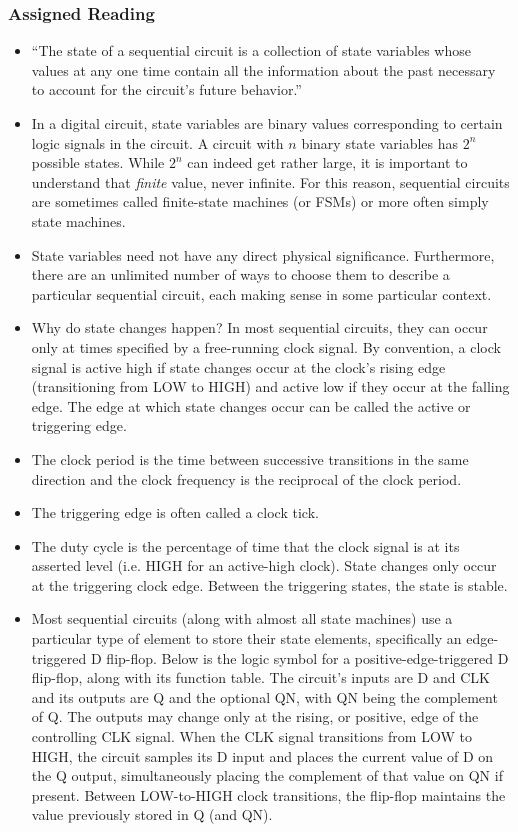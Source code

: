 \documentclass[10pt,a4paper]{article}
\begin{document}
\subsubsection{Assigned Reading}
\begin{itemize}
\item ``The state of a sequential circuit is a collection of state variables whose values at any one time contain all the information about the past necessary to account for the circuit's future behavior.''
\item In a digital circuit, state variables are binary values corresponding to certain logic signals in the circuit. A circuit with $n$ binary state variables has $2^n$ possible states. While $2^n$ can indeed get rather large, it is important to understand that \textit{finite} value, never infinite. For this reason, sequential circuits are sometimes called finite-state machines (or FSMs) or more often simply state machines.
\item State variables need not have any direct physical significance. Furthermore, there are an unlimited number of ways to choose them to describe a particular sequential circuit, each making sense in some particular context. 
\item Why do state changes happen? In most sequential circuits, they can occur only at times specified by a free-running clock signal. By convention, a clock signal is active high if state changes occur at the clock's rising edge (transitioning from LOW to HIGH) and active low if they occur at the falling edge. The edge at which state changes occur can be called the active or triggering edge. 
\item The clock period is the time between successive transitions in the same direction and the clock frequency is the reciprocal of the clock period. 
\item The triggering edge is often called a clock tick.
\item The duty cycle is the percentage of time that the clock signal is at its asserted level (i.e. HIGH for an active-high clock). State changes only occur at the triggering clock edge. Between the triggering states, the state is stable.
\item Most sequential circuits (along with almost all state machines) use a particular type of element to store their state elements, specifically an edge-triggered D flip-flop. Below is the logic symbol for a positive-edge-triggered D flip-flop, along with its function table. The circuit's inputs are D and CLK and its outputs are Q and the optional QN, with QN being the complement of Q. The outputs may change only at the rising, or positive, edge of the controlling CLK signal. When the CLK signal transitions from LOW to HIGH, the circuit samples its D input and places the current value of D on the Q output, simultaneously placing the complement of that value on QN if present. Between LOW-to-HIGH clock transitions, the flip-flop maintains the value previously stored in Q (and QN).

\end{itemize}
\end{document}
